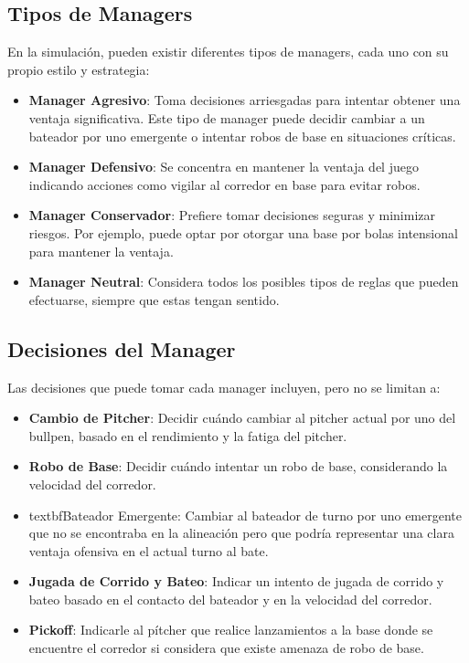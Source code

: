\documentclass[runningheads]{llncs}
\begin{document}
    \subsection{Tipos de Managers}
        En la simulación, pueden existir diferentes tipos de managers, cada uno con su propio estilo y estrategia:
        \begin{itemize}
            \item \textbf{Manager Agresivo}: Toma decisiones arriesgadas para intentar obtener una ventaja significativa. Este tipo de manager puede decidir cambiar a un bateador por uno emergente o intentar robos de base en situaciones críticas.
            \item \textbf{Manager Defensivo}: Se concentra en mantener la ventaja del juego indicando acciones como vigilar al corredor en base para evitar robos.
            \item \textbf{Manager Conservador}: Prefiere tomar decisiones seguras y minimizar riesgos. Por ejemplo, puede optar por otorgar una base por bolas intensional para mantener la ventaja.
            \item \textbf{Manager Neutral}: Considera todos los posibles tipos de reglas que pueden efectuarse, siempre que estas tengan sentido.
        \end{itemize}

    \subsection{Decisiones del Manager}
        Las decisiones que puede tomar cada manager incluyen, pero no se limitan a:
        \begin{itemize}
            \item \textbf{Cambio de Pitcher}: Decidir cuándo cambiar al pitcher actual por uno del bullpen, basado en el rendimiento y la fatiga del pitcher.
            \item \textbf{Robo de Base}: Decidir cuándo intentar un robo de base, considerando la velocidad del corredor.
            \item textbf{Bateador Emergente}: Cambiar al bateador de turno por uno emergente que no se encontraba en la alineación pero que podría representar una clara ventaja ofensiva en el actual turno al bate.
            \item \textbf{Jugada de Corrido y Bateo}: Indicar un intento de jugada de corrido y bateo basado en el contacto del bateador y en la velocidad del corredor.
            \item \textbf{Pickoff}: Indicarle al pítcher que realice lanzamientos a la base donde se encuentre el corredor si considera que existe amenaza de robo de base.
        \end{itemize}
\end{document}

